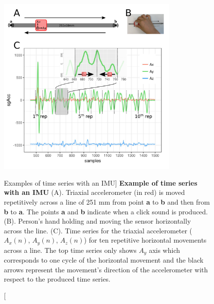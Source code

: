 \begin{figure}
 \centering
   \includegraphics[width=0.8\textwidth]{hmov}
   \caption
	[Examples of time series with an IMU]{
	{\bf Example of time series with an IMU}
	(A). Triaxial accelerometer (in red) is moved repetitively across a line
   	of 251 mm from point \textbf{a} to \textbf{b} and then from
   	\textbf{b} to \textbf{a}. 
   	The points \textbf{a} and \textbf{b} indicate when a click 
	sound is produced.
	(B). Person's hand holding and moving the sensor horizontally 
	across the line.
	(C). Time series for the triaxial accelerometer 
	($A_x(n)$, $A_y(n)$, $A_z(n)$) for ten repetitive horizontal 
	movements across a line. The top time series only
   	shows $A_y$ axis which corresponds to one cycle of the 
	horizontal movement and the black arrows represent the 
	movement's direction of the accelerometer with respect 
	to the produced time series.
	}
   \label{fig:acc}
\end{figure}







